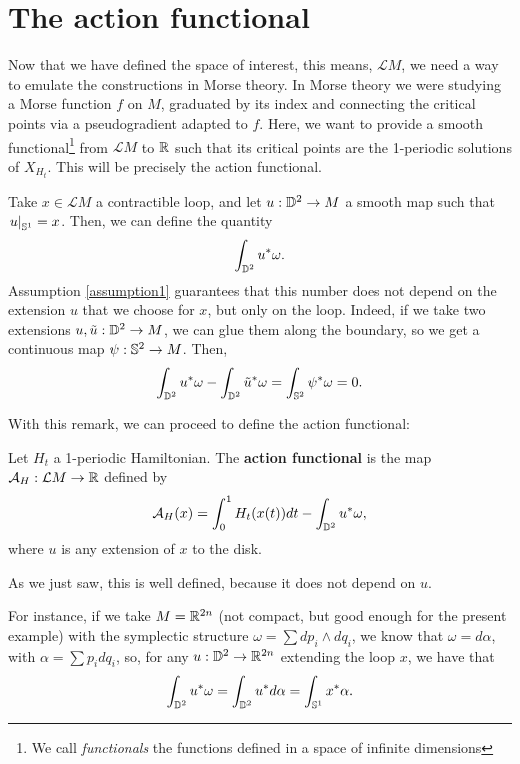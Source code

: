 \section{The action functional}

Now that we have defined the space of interest, this means, $\mathcal{L}M$, we need a way to emulate the constructions in Morse theory. In Morse theory we were studying a Morse function $f$ on $M$, graduated by its index and connecting the critical points via a pseudogradient adapted to $f$. Here, we want to provide a smooth functional\footnote{We call {\it functionals} the functions defined in a space of infinite dimensions} from $\mathcal{L}M$ to $\mathbb{R}$ such that its critical points are the 1-periodic solutions of $X_{H_t}$. This will be precisely the action functional.

\begin{rmrk}
Take $x \in \mathcal{L}M$ a contractible loop, and let $u : \mathbb{D}^2 \rightarrow M$ a smooth map such that $\left. u \right|_{\mathbb{S}^1} = x$. Then, we can define the quantity
\[\int_{\mathbb{D}^2} u^{\ast}\omega .\]
Assumption \ref{assumption1} guarantees that this number does not depend on the extension $u$ that we choose for $x$, but only on the loop. Indeed, if we take two extensions $u, \tilde{u} : \mathbb{D}^2 \rightarrow M$, we can glue them along the boundary, so we get a continuous map $\psi : \mathbb{S}^2 \rightarrow M$. Then,
\[\int_{\mathbb{D}^2} u^{\ast} \omega - \int_{\mathbb{D}^2} \tilde{u}^{\ast} \omega = \int_{\mathbb{S}^2} \psi^{\ast} \omega = 0 .\]
\end{rmrk}

With this remark, we can proceed to define the action functional:

\begin{deff}
Let $H_t$ a 1-periodic Hamiltonian. The {\bf action functional} is the map $\mathcal{A}_H : \mathcal{L}M \rightarrow \mathbb{R}$ defined by
\[\mathcal{A}_H(x) = \int_0^1 H_t(x(t)) d t - \int_{\mathbb{D}^2} u^{\ast} \omega ,\]
where $u$ is any extension of $x$ to the disk.
\end{deff}

As we just saw, this is well defined, because it does not depend on $u$.

For instance, if we take $M = \mathbb{R}^{2n}$ (not compact, but good enough for the present example) with the symplectic structure $\omega = \sum d p_i \wedge d q_i$, we know that $\omega = d \alpha$, with $\alpha = \sum p_i d q_i$, so, for any $u : \mathbb{D}^2 \rightarrow \mathbb{R}^{2n}$ extending the loop $x$, we have that
\[\int_{\mathbb{D}^2} u^{\ast} \omega = \int_{\mathbb{D}^2}  u^{\ast} d \alpha = \int_{\mathbb{S}^1} x^{\ast} \alpha .\]

